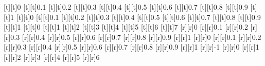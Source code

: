\begin{psfrags}
[t][t]{0}%
[t][t]{0.1}%
[t][t]{0.2}%
[t][t]{0.3}%
[t][t]{0.4}%
[t][t]{0.5}%
[t][t]{0.6}%
[t][t]{0.7}%
[t][t]{0.8}%
[t][t]{0.9}%
[t][t]{1}%
[t][t]{0}%
[t][t]{0.1}%
[t][t]{0.2}%
[t][t]{0.3}%
[t][t]{0.4}%
[t][t]{0.5}%
[t][t]{0.6}%
[t][t]{0.7}%
[t][t]{0.8}%
[t][t]{0.9}%
[t][t]{1}%
[t][t]{0}%
[t][t]{1}%
[t][t]{2}%
[t][t]{3}%
[t][t]{4}%
[t][t]{5}%
[t][t]{6}%
[t][t]{7}%
%
[r][r]{0}%
[r][r]{0.1}%
[r][r]{0.2}%
[r][r]{0.3}%
[r][r]{0.4}%
[r][r]{0.5}%
[r][r]{0.6}%
[r][r]{0.7}%
[r][r]{0.8}%
[r][r]{0.9}%
[r][r]{1}%
[r][r]{0}%
[r][r]{0.1}%
[r][r]{0.2}%
[r][r]{0.3}%
[r][r]{0.4}%
[r][r]{0.5}%
[r][r]{0.6}%
[r][r]{0.7}%
[r][r]{0.8}%
[r][r]{0.9}%
[r][r]{1}%
[r][r]{-1}%
[r][r]{0}%
[r][r]{1}%
[r][r]{2}%
[r][r]{3}%
[r][r]{4}%
[r][r]{5}%
[r][r]{6}%
%
%
\end{psfrags}%
%
